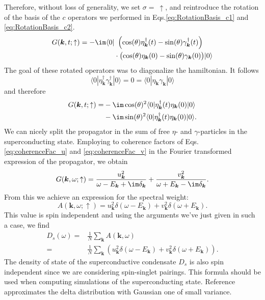 \documentclass[../main.tex]{subfile}
\begin{document}
Therefore, without loss of generality, we set $\sigma = ~ \uparrow$, and reintroduce the rotation of the basis of the $c$ operators 
we performed in Eqs.\ref{eq:RotationBasis_c1} and \ref{eq:RotationBasis_c2}.
\begin{align*}
    G(\bm{k},t; \uparrow) = -\im \langle 0 |&~\left(\cos(\theta) \eta_{\bm{k}}^{\dagger}(t) - \sin(\theta) \gamma_{\bm{k}}^{\dagger}(t)\right)\\
    &\cdot\bigl(\cos(\theta) \eta_{\bm{k}}(0) - \sin(\theta) \gamma_{\bm{k}}(0)\bigr) | 0 \rangle
\end{align*}
The goal of these rotated operators was to diagonalize the hamiltonian. It follows
\[
    \langle 0|\eta_{\bm{k}}^{\dagger}\gamma_{\bm{k}}^{\dagger} | 0\rangle = 0 =  \langle 0|\eta_{\bm{k}}\gamma_{\bm{k}} | 0\rangle
\] 
and therefore
\begin{equation}
    \begin{aligned}
        G(\bm{k},t; \uparrow) =& -\im \cos(\theta)^2 \langle 0 | \eta_{\bm{k}}^{\dagger}(t)\eta_{\bm{k}}(0) | 0 \rangle \\
        & -\im\sin(\theta)^2 \langle 0 | \eta_{\bm{k}}^{\dagger}(t)\eta_{\bm{k}}(0) | 0 \rangle .
    \end{aligned}
\end{equation}
We can nicely split the propagator in the sum of free $\eta$- and $\gamma$-particles in the superconducting state.
Employing to coherence factors of Eqs.\ref{eq:coherenceFac_u} and \ref{eq:coherenceFac_v} in the Fourier transformed expression of the propagator, we obtain
\[
    G(\bm{k}, \omega; \uparrow) = \frac{u_{\bm{k}}^2}{\omega - E_{\bm{k}} + \im\delta_{\bm{k}}} + \frac{v_{\bm{k}}^2}{\omega + E_{\bm{k}} - \im\delta_{\bm{k}}}.
\]
From this we achieve an expression for the spectral weight:
\[
    A(\bm{k}, \omega; \uparrow) = u^2_{\bm{k}}\delta(\omega - E_{\bm{k}}) + v^2_{\bm{k}}\delta(\omega + E_{\bm{k}}).
\]
This value is spin independent and using the arguments we've just given in such a case, we find
\begin{align*}
    D_s(\omega) =& \frac{1}{N} \sum_{\bm{k}} A(\bm{k},\omega)\\
        =& \frac{1}{N} \sum_{\bm{k}} \left(u^2_{\bm{k}}\delta(\omega - E_{\bm{k}}) + v^2_{\bm{k}}\delta(\omega + E_{\bm{k}})\right).
\end{align*}
The density of state of the superconductive condensate $D_s$ is also spin independent since we are considering spin-singlet pairings. This formula should be used
when computing simulations of the superconducting state. Reference \cite{Mjos2019} approximates the delta distribution with Gaussian one of small variance.\\ 
\end{document}
